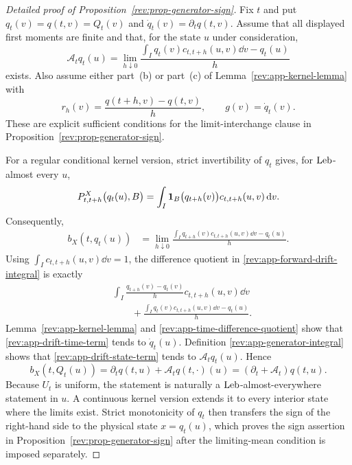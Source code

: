 \begin{proof}[Detailed proof of Proposition~\ref{rev:prop-generator-sign}]
Fix $t$ and put $q_t(v)=q(t,v)=Q_t(v)$ and
$\dot q_t(v)=\partial_tq(t,v)$.  Assume that all displayed first moments are
finite and that, for the state $u$ under consideration,
\begin{equation}
\mathcal A_tq_t(u)
=\lim_{h\downarrow0}
\frac{\int_Iq_t(v)c_{t,t+h}(u,v)\dd v-q_t(u)}{h}
\label{rev:app-generator-integral}
\end{equation}
exists.  Also assume either part~(b) or part~(c) of
Lemma~\ref{rev:app-kernel-lemma} with
\begin{equation}
r_h(v)=\frac{q(t+h,v)-q(t,v)}{h},
\qquad g(v)=\dot q_t(v).
\label{rev:app-time-difference-quotient}
\end{equation}
These are explicit sufficient conditions for the limit-interchange clause in
Proposition~\ref{rev:prop-generator-sign}.

For a regular conditional kernel version, strict invertibility of $q_t$ gives,
for $\operatorname{Leb}$-almost every $u$,
\begin{equation}
P^X_{t,t+h}\bigl(q_t(u),B\bigr)
=\int_I\mathbf 1_{B}\bigl(q_{t+h}(v)\bigr)c_{t,t+h}(u,v)\,\mathrm d v.
\label{rev:app-pushforward-kernel}
\end{equation}
Consequently,
\begin{align}
b_X(t,q_t(u))
&=\lim_{h\downarrow0}
\frac{\int_Iq_{t+h}(v)c_{t,t+h}(u,v)\dd v-q_t(u)}{h}.
\label{rev:app-forward-drift-integral}
\end{align}
Using $\int_Ic_{t,t+h}(u,v)\dd v=1$, the difference quotient in
\eqref{rev:app-forward-drift-integral} is exactly
\begin{align}
&\int_I
\frac{q_{t+h}(v)-q_t(v)}{h}c_{t,t+h}(u,v)\dd v
\label{rev:app-drift-time-term}\\
&\qquad+
\frac{\int_Iq_t(v)c_{t,t+h}(u,v)\dd v-q_t(u)}{h}.
\label{rev:app-drift-state-term}
\end{align}
Lemma~\ref{rev:app-kernel-lemma} and
\eqref{rev:app-time-difference-quotient} show that
\eqref{rev:app-drift-time-term} tends to $\dot q_t(u)$.  Definition
\eqref{rev:app-generator-integral} shows that
\eqref{rev:app-drift-state-term} tends to $\mathcal A_tq_t(u)$.  Hence
\begin{equation}
b_X(t,Q_t(u))
=\partial_tq(t,u)+\mathcal A_tq(t,\cdot)(u)
=(\partial_t+\mathcal A_t)q(t,u).
\label{rev:app-full-drift-identity}
\end{equation}
Because $U_t$ is uniform, the statement is naturally a
$\operatorname{Leb}$-almost-everywhere statement in $u$.  A continuous kernel version extends
it to every interior state where the limits exist.  Strict monotonicity of
$q_t$ then transfers the sign of the right-hand side to the physical state
$x=q_t(u)$, which proves the sign assertion in
Proposition~\ref{rev:prop-generator-sign} after the limiting-mean condition is
imposed separately.
\end{proof}

